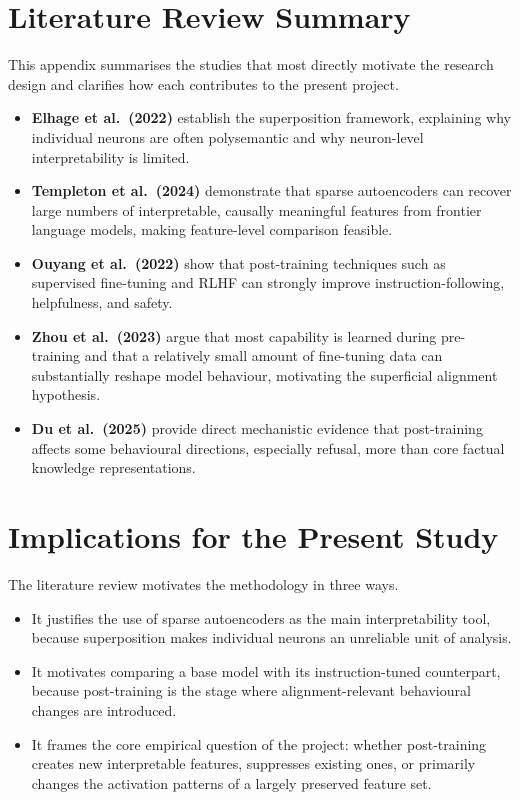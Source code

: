 \section{Literature Review Summary}
\label{sec:appendix-literature-summary}

This appendix summarises the studies that most directly motivate the research design and clarifies how each contributes to the present project.

\begin{itemize}
    \item \textbf{Elhage et al.\ (2022)} \parencite{elhage_toy_2022} establish the superposition framework, explaining why individual neurons are often polysemantic and why neuron-level interpretability is limited.
    \item \textbf{Templeton et al.\ (2024)} \parencite{templeton_scaling_2024} demonstrate that sparse autoencoders can recover large numbers of interpretable, causally meaningful features from frontier language models, making feature-level comparison feasible.
    \item \textbf{Ouyang et al.\ (2022)} \parencite{ouyang_training_2022} show that post-training techniques such as supervised fine-tuning and RLHF can strongly improve instruction-following, helpfulness, and safety.
    \item \textbf{Zhou et al.\ (2023)} \parencite{zhou_lima_2023} argue that most capability is learned during pre-training and that a relatively small amount of fine-tuning data can substantially reshape model behaviour, motivating the superficial alignment hypothesis.
    \item \textbf{Du et al.\ (2025)} \parencite{du_how_2025} provide direct mechanistic evidence that post-training affects some behavioural directions, especially refusal, more than core factual knowledge representations.
\end{itemize}

\section{Implications for the Present Study}
\label{sec:appendix-literature-implications}

The literature review motivates the methodology in three ways.

\begin{itemize}
    \item It justifies the use of sparse autoencoders as the main interpretability tool, because superposition makes individual neurons an unreliable unit of analysis.
    \item It motivates comparing a base model with its instruction-tuned counterpart, because post-training is the stage where alignment-relevant behavioural changes are introduced.
    \item It frames the core empirical question of the project: whether post-training creates new interpretable features, suppresses existing ones, or primarily changes the activation patterns of a largely preserved feature set.
\end{itemize}
